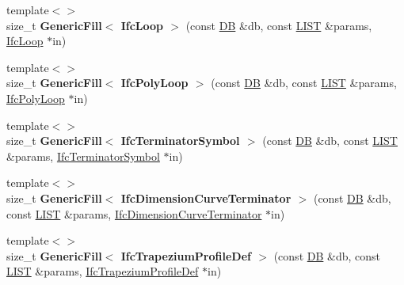 \begin{DoxyCompactItemize}
\item 
\hypertarget{namespace_assimp_1_1_s_t_e_p_a25900997b5adebced7548dba4fe55123}{{\footnotesize template$<$$>$ }\\size\+\_\+t {\bfseries Generic\+Fill$<$ Ifc\+Loop $>$} (const \hyperlink{class_assimp_1_1_s_t_e_p_1_1_d_b}{D\+B} \&db, const \hyperlink{class_assimp_1_1_s_t_e_p_1_1_e_x_p_r_e_s_s_1_1_l_i_s_t}{L\+I\+S\+T} \&params, \hyperlink{struct_assimp_1_1_i_f_c_1_1_ifc_loop}{Ifc\+Loop} $\ast$in)}\label{namespace_assimp_1_1_s_t_e_p_a25900997b5adebced7548dba4fe55123}

\item 
\hypertarget{namespace_assimp_1_1_s_t_e_p_adfd4645b3898fd50ded033c0baadbb5b}{{\footnotesize template$<$$>$ }\\size\+\_\+t {\bfseries Generic\+Fill$<$ Ifc\+Poly\+Loop $>$} (const \hyperlink{class_assimp_1_1_s_t_e_p_1_1_d_b}{D\+B} \&db, const \hyperlink{class_assimp_1_1_s_t_e_p_1_1_e_x_p_r_e_s_s_1_1_l_i_s_t}{L\+I\+S\+T} \&params, \hyperlink{struct_assimp_1_1_i_f_c_1_1_ifc_poly_loop}{Ifc\+Poly\+Loop} $\ast$in)}\label{namespace_assimp_1_1_s_t_e_p_adfd4645b3898fd50ded033c0baadbb5b}

\item 
\hypertarget{namespace_assimp_1_1_s_t_e_p_a93100b073356d4ffd757d3f959ff8927}{{\footnotesize template$<$$>$ }\\size\+\_\+t {\bfseries Generic\+Fill$<$ Ifc\+Terminator\+Symbol $>$} (const \hyperlink{class_assimp_1_1_s_t_e_p_1_1_d_b}{D\+B} \&db, const \hyperlink{class_assimp_1_1_s_t_e_p_1_1_e_x_p_r_e_s_s_1_1_l_i_s_t}{L\+I\+S\+T} \&params, \hyperlink{struct_assimp_1_1_i_f_c_1_1_ifc_terminator_symbol}{Ifc\+Terminator\+Symbol} $\ast$in)}\label{namespace_assimp_1_1_s_t_e_p_a93100b073356d4ffd757d3f959ff8927}

\item 
\hypertarget{namespace_assimp_1_1_s_t_e_p_a21e6abf684aa00df9aa05cc8ad13190b}{{\footnotesize template$<$$>$ }\\size\+\_\+t {\bfseries Generic\+Fill$<$ Ifc\+Dimension\+Curve\+Terminator $>$} (const \hyperlink{class_assimp_1_1_s_t_e_p_1_1_d_b}{D\+B} \&db, const \hyperlink{class_assimp_1_1_s_t_e_p_1_1_e_x_p_r_e_s_s_1_1_l_i_s_t}{L\+I\+S\+T} \&params, \hyperlink{struct_assimp_1_1_i_f_c_1_1_ifc_dimension_curve_terminator}{Ifc\+Dimension\+Curve\+Terminator} $\ast$in)}\label{namespace_assimp_1_1_s_t_e_p_a21e6abf684aa00df9aa05cc8ad13190b}

\item 
\hypertarget{namespace_assimp_1_1_s_t_e_p_a54b6749ec908c5be83f9368dc2be5b97}{{\footnotesize template$<$$>$ }\\size\+\_\+t {\bfseries Generic\+Fill$<$ Ifc\+Trapezium\+Profile\+Def $>$} (const \hyperlink{class_assimp_1_1_s_t_e_p_1_1_d_b}{D\+B} \&db, const \hyperlink{class_assimp_1_1_s_t_e_p_1_1_e_x_p_r_e_s_s_1_1_l_i_s_t}{L\+I\+S\+T} \&params, \hyperlink{struct_assimp_1_1_i_f_c_1_1_ifc_trapezium_profile_def}{Ifc\+Trapezium\+Profile\+Def} $\ast$in)}\label{namespace_assimp_1_1_s_t_e_p_a54b6749ec908c5be83f9368dc2be5b97}


\end{DoxyCompactItemize}
